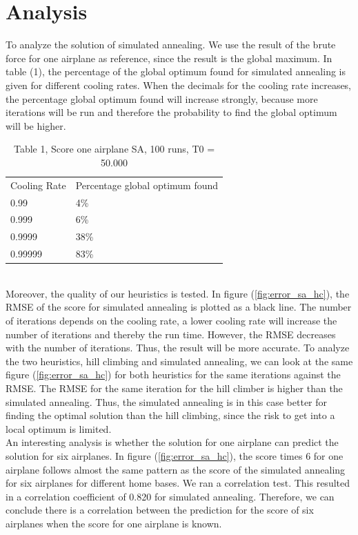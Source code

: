 \documentclass[journal]{IEEEtran}
\begin{document}
\section{Analysis}
To analyze the solution of simulated annealing. We use the result of the brute force for one airplane as reference, since the result is the global maximum. In table (1), the percentage of the global optimum found for simulated annealing is given for different cooling rates. When the decimals for the cooling rate increases, the percentage global optimum found will increase strongly, because more iterations will be run and therefore the probability to find the global optimum will be higher.
\begin{table}[h]
\begin{tabular}{ll}
Cooling Rate & Percentage global optimum found \\
0.99         & 4\%                             \\
0.999        & 6\%                             \\
0.9999       & 38\%                            \\
0.99999      & 83\%                              
\end{tabular}
\caption{\tiny{Table 1, Score one airplane SA, 100 runs, T0 = 50.000}}
\end{table}
\\
Moreover, the quality of our heuristics is tested. In figure (\ref{fig:error_sa_hc}), the RMSE of the score for simulated annealing is plotted as a black line. The number of iterations depends on the cooling rate, a lower cooling rate will increase the number of iterations and thereby the run time. However, the RMSE decreases with the number of iterations. Thus, the result will be more accurate.  To analyze the two heuristics, hill climbing and simulated annealing, we can look at the same figure (\ref{fig:error_sa_hc}) for both heuristics for the same iterations against the RMSE. The RMSE for the same iteration for the hill climber is higher than the simulated annealing. Thus, the simulated annealing is in this case better for finding the optimal solution than the hill climbing, since the risk to get into a local optimum is limited.\\
An interesting analysis is whether the solution for one airplane can predict the solution for six airplanes. In figure (\ref{fig:error_sa_hc}), the score times 6 for one airplane follows almost the same pattern as the score of the simulated annealing for six airplanes for different home bases. We ran a correlation test.  This resulted in a correlation coefficient of 0.820 for simulated annealing. Therefore, we can conclude there is a correlation between the prediction for the score of six airplanes when the score for one airplane is known.\\
\end{document}
